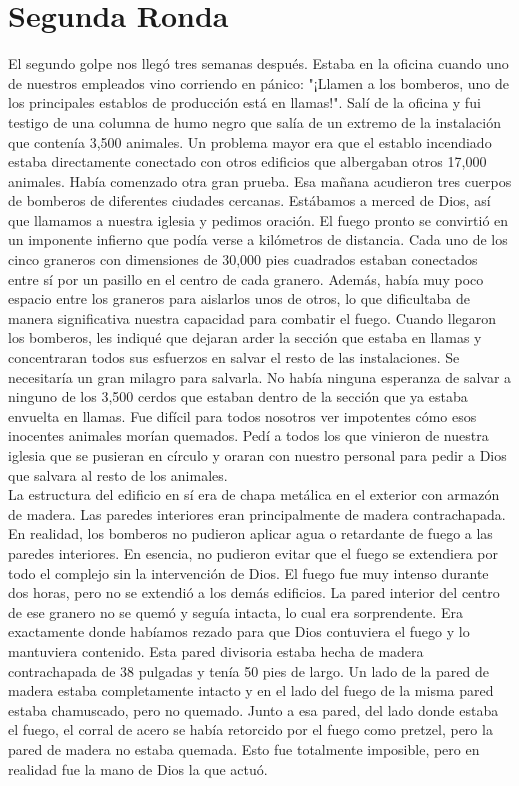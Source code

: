 \documentclass[twoside, 12pt]{book}
\begin{document}
 
\section{Segunda Ronda}

El segundo golpe nos llegó tres semanas después. Estaba en la oficina cuando uno de nuestros empleados vino corriendo en pánico: "¡Llamen a los bomberos, uno de los principales establos de producción está en llamas!". Salí de la oficina y fui testigo de una columna de humo negro que salía de un extremo de la instalación que contenía 3,500 animales. Un problema mayor era que el establo incendiado estaba directamente conectado con otros edificios que albergaban otros 17,000 animales. Había comenzado otra gran prueba. Esa mañana acudieron tres cuerpos de bomberos de diferentes ciudades cercanas. Estábamos a merced de Dios, así que llamamos a nuestra iglesia y pedimos oración. El fuego pronto se convirtió en un imponente infierno que podía verse a kilómetros de distancia. Cada uno de los cinco graneros con dimensiones de 30,000 pies cuadrados estaban conectados entre sí por un pasillo en el centro de cada granero. Además, había muy poco espacio entre los graneros para aislarlos unos de otros, lo que dificultaba de manera significativa nuestra capacidad para combatir el fuego. Cuando llegaron los bomberos, les indiqué que dejaran arder la sección que estaba en llamas y concentraran todos sus esfuerzos en salvar el resto de las instalaciones. Se necesitaría un gran milagro para salvarla. No había ninguna esperanza de salvar a ninguno de los 3,500 cerdos que estaban dentro de la sección que ya estaba envuelta en llamas. Fue difícil para todos nosotros ver impotentes cómo esos inocentes animales morían quemados. Pedí a todos los que vinieron de nuestra iglesia que se pusieran en círculo y oraran con nuestro personal para pedir a Dios que salvara al resto de los animales.\\

La estructura del edificio en sí era de chapa metálica en el exterior con armazón de madera. Las paredes interiores eran principalmente de madera contrachapada. En realidad, los bomberos no pudieron aplicar agua o retardante de fuego a las paredes interiores. En esencia, no pudieron evitar que el fuego se extendiera por todo el complejo sin la intervención de Dios. El fuego fue muy intenso durante dos horas, pero no se extendió a los demás edificios. La pared interior del centro de ese granero no se quemó y seguía intacta, lo cual era sorprendente. Era exactamente donde habíamos rezado para que Dios contuviera el fuego y lo mantuviera contenido. Esta pared divisoria estaba hecha de madera contrachapada de 38 pulgadas y tenía 50 pies de largo. Un lado de la pared de madera estaba completamente intacto y en el lado del fuego de la misma pared estaba chamuscado, pero no quemado. Junto a esa pared, del lado donde estaba el fuego, el corral de acero se había retorcido por el fuego como pretzel, pero la pared de madera no estaba quemada. Esto fue totalmente imposible, pero en realidad fue la mano de Dios la que actuó.\\
\end{document}
